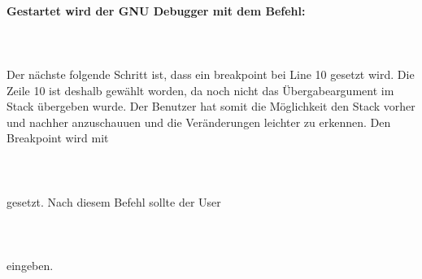 \\
\textbf{Gestartet wird der GNU Debugger mit dem Befehl:}\\\\
\\\\
Der nächste folgende Schritt ist, dass ein breakpoint bei Line 10 gesetzt wird. Die Zeile 10 ist deshalb gewählt worden, da noch nicht das Übergabeargument im Stack übergeben wurde. Der Benutzer hat somit die Möglichkeit den Stack vorher und nachher anzuschauuen und die Veränderungen leichter zu erkennen. Den Breakpoint wird mit\\\\ \\\\ gesetzt. Nach diesem Befehl sollte der User\\\\ \\\\ eingeben. 
\\
